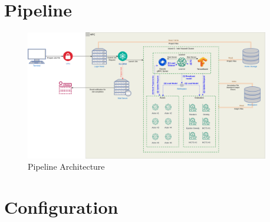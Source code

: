 \section{Pipeline}
\begin{figure}
	\centering
	\includegraphics[width=0.95\textwidth]{Figures/AlphaZero.png}
	\caption{Pipeline Architecture}
\end{figure}
\section{Configuration}

